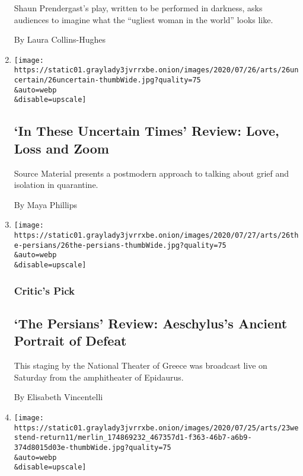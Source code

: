 \begin{enumerate}
  Shaun Prendergast's play, written to be performed in darkness, asks
  audiences to imagine what the ``ugliest woman in the world'' looks
  like.

  By Laura Collins-Hughes
\item
  \href{/2020/07/26/theater/in-these-uncertain-times-review.html}{}

  \texttt{[image: https://static01.graylady3jvrrxbe.onion/images/2020/07/26/arts/26uncertain/26uncertain-thumbWide.jpg?quality=75\\\&auto=webp\\\&disable=upscale]}

  \hypertarget{in-these-uncertain-times-review-love-loss-and-zoom}{%
  \subsection{`In These Uncertain Times' Review: Love, Loss and
  Zoom}\label{in-these-uncertain-times-review-love-loss-and-zoom}}

  Source Material presents a postmodern approach to talking about grief
  and isolation in quarantine.

  By Maya Phillips
\item
  \href{/2020/07/26/theater/the-persians-review-aeschylus.html}{}

  \texttt{[image: https://static01.graylady3jvrrxbe.onion/images/2020/07/27/arts/26the-persians/26the-persians-thumbWide.jpg?quality=75\\\&auto=webp\\\&disable=upscale]}

  \hypertarget{critics-pick-1}{%
  \subsubsection{Critic's Pick}\label{critics-pick-1}}

  \hypertarget{the-persians-review-aeschyluss-ancient-portrait-of-defeat}{%
  \subsection{`The Persians' Review: Aeschylus's Ancient Portrait of
  Defeat}\label{the-persians-review-aeschyluss-ancient-portrait-of-defeat}}

  This staging by the National Theater of Greece was broadcast live on
  Saturday from the amphitheater of Epidaurus.

  By Elisabeth Vincentelli
\item
  \href{/2020/07/23/theater/west-end-london-virus.html}{}

  \texttt{[image: https://static01.graylady3jvrrxbe.onion/images/2020/07/25/arts/23westend-return11/merlin\_174869232\_467357d1-f363-46b7-a6b9-374d8015d03e-thumbWide.jpg?quality=75\\\&auto=webp\\\&disable=upscale]}


\end{enumerate}
